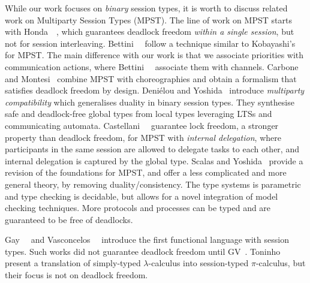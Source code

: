 \documentclass[main.tex]{subfiles}
\begin{document}
While our work focuses on \emph{binary} session types, it is worth to discuss related work on Multiparty Session Types (MPST). The line of work on MPST starts with Honda~\etal~\cite{hondayoshida08}, which guarantees deadlock freedom \emph{within a single session}, but not for session interleaving.
Bettini~\etal~\cite{bettinicoppo08} follow a technique similar to Kobayashi's for MPST.
The main difference with our work is that we associate priorities with communication actions, where Bettini~\etal~\cite{bettinicoppo08} associate them with channels.
Carbone and Montesi~\cite{carbonemontesi13} combine MPST with choreographies and obtain a formalism that satisfies deadlock freedom by design.
Deni\'{e}lou and Yoshida~\cite{DenielouY13} introduce \emph{multiparty compatibility} which generalises duality in binary session types. They synthesise safe and deadlock-free global types from local types leveraging LTSs and communicating automata.
Castellani~\etal~\cite{CastellaniDGH20} guarantee lock freedom, a stronger property than deadlock freedom, for MPST with \emph{internal delegation}, where participants in the same session are allowed to delegate tasks to each other, and internal delegation is captured by the global type.
Scalas and Yoshida~\cite{scalasyoshida19} provide a revision of the foundations for MPST, and offer a less complicated and more general theory, by removing duality/consistency. The type systems is parametric and type checking is decidable, but allows for a novel integration of model checking techniques. More protocols and processes can be typed and are guaranteed to be free of deadlocks.

Gay~\etal~\cite{gaynagarajan03} and Vasconcelos~\etal~\cite{vasconcelosravara04,vasconcelosgay06} introduce the first functional language with session types. Such works did not guarantee deadlock freedom until GV~\cite{lindleymorris15,wadler14}.
Toninho~\etal~\cite{toninhocaires12} present a translation of simply-typed $\lambda$-calculus into session-typed $\pi$-calculus, but their focus is not on deadlock freedom.
\end{document}
